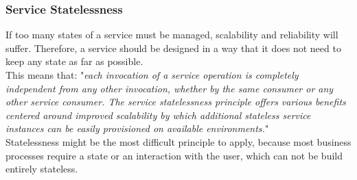 \documentclass[12pt]{article}
\begin{document}
\subsubsection{Service Statelessness}
If too many states of a service must be managed, scalability and reliability will suffer. Therefore, a service should be designed in a way that it does not need to keep any state as far as possible. \cite[page 88]{te}\\
This means that: "\textit{each invocation of a service operation is completely independent from any other invocation, whether by the same consumer or any other service consumer. The service statelessness principle offers various benefits centered around improved scalability by which additional stateless service instances can be easily provisioned on available environments.}" \cite[page 197]{grau}\\
Statelessness might be the most difficult principle to apply, because most business processes require a state or an interaction with the user, which can not be build entirely stateless.
\newpage

\end{document}
